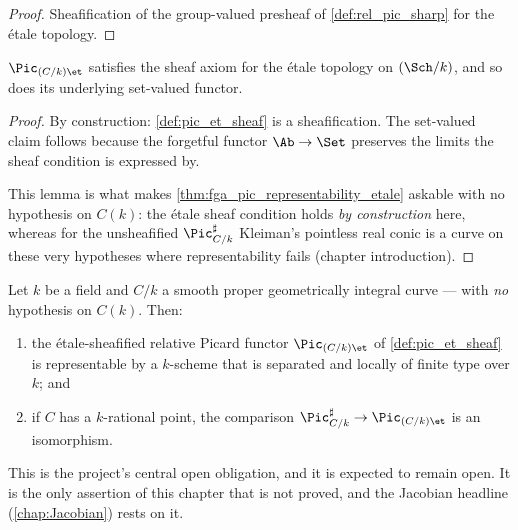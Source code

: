 \begin{proof}\leanok
  Sheafification of the group-valued presheaf of \cref{def:rel_pic_sharp} for
  the \'etale topology.
\end{proof}

\begin{lemma}\leanok
  \label{lem:pic_et_is_sheaf}
  \(\Pic_{(C/k)\et}\) satisfies the sheaf axiom for the \'etale topology on
  \((\Sch/k)\), and so does its underlying set-valued functor.
\end{lemma}

\begin{proof}\leanok
  By construction: \cref{def:pic_et_sheaf} is a sheafification. The set-valued
  claim follows because the forgetful functor \(\Ab \to \Set\) preserves the
  limits the sheaf condition is expressed by.

  This lemma is what makes \cref{thm:fga_pic_representability_etale} askable with
  no hypothesis on \(C(k)\): the \'etale sheaf condition holds \emph{by
  construction} here, whereas for the unsheafified \(\Pic^\sharp_{C/k}\) Kleiman's
  pointless real conic is a curve on these very hypotheses where representability
  fails (chapter introduction).
\end{proof}

\begin{theorem}
  \label{thm:fga_pic_representability_etale}
  Let \(k\) be a field and \(C/k\) a smooth proper geometrically integral
  curve --- with \emph{no} hypothesis on \(C(k)\). Then:
  \begin{enumerate}
    \item the \'etale-sheafified relative Picard functor \(\Pic_{(C/k)\et}\) of
      \cref{def:pic_et_sheaf} is representable by a \(k\)-scheme that is
      separated and locally of finite type over \(k\); and
    \item if \(C\) has a \(k\)-rational point, the comparison
      \(\Pic^\sharp_{C/k} \to \Pic_{(C/k)\et}\) is an isomorphism.
  \end{enumerate}

  This is the project's central open obligation, and it is expected to remain
  open. It is the only assertion of this chapter that is not proved, and the
  Jacobian headline (\cref{chap:Jacobian}) rests on it.
\end{theorem}

